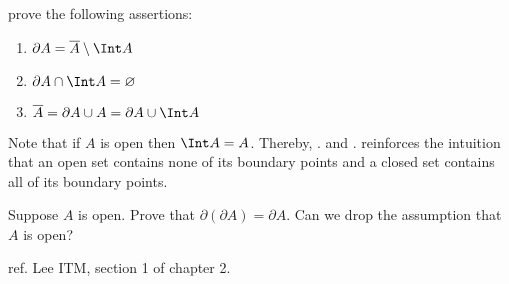 \documentclass{pset}
\begin{document}
\begin{exercise}[\skipforward]
    prove the following assertions:
    \begin{enumerate}[label=\roman*.]
        \item $\partial A = \overline A\setminus \Int A$
        \item $\partial A\cap \Int A=\varnothing$
        \item $\overline A = \partial A \cup A = \partial A \cup \Int A$
    \end{enumerate}
\end{exercise}
Note that if $A$ is open then $\Int A = A$. Thereby, . and . reinforces the intuition that an open set contains none of its boundary points and a closed set contains all of its boundary points.
\begin{exercise}
    Suppose $A$ is open. Prove that $\partial(\partial A) = \partial A$. Can we drop the assumption that $A$ is open?
\end{exercise}

{\tiny ref. Lee ITM, section 1 of chapter 2.}
\end{document}
